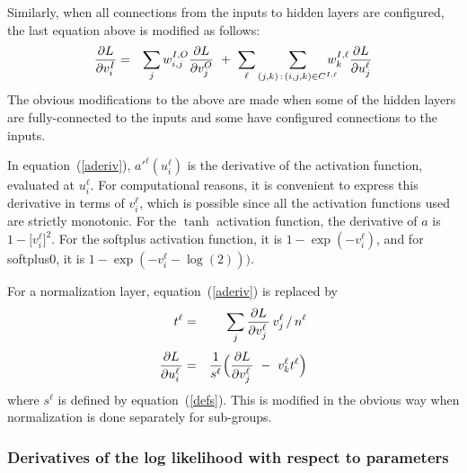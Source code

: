 \documentclass{report}[11pt]
\def\beq{\begin{eqnarray}}
\def\eeq{\end{eqnarray}}
\begin{document}
Similarly, when all connections from the inputs to hidden layers are
configured, the last equation above is modified as follows:\beq
  {\partial L \over \partial v^I_{i\ }\!} & = & 
    \sum_j w^{I,O}_{i,j} {\partial L \over \partial v^O_j}\ +\
    \sum_{\ell} 
         \sum_{(j,k)\,:\, (i,j,k)\in C^{I,\ell}}\!\!\!\!\!\!
             w^{I,\ell}_k {\partial L \over \partial u^{\ell}_j }
\eeq%
The obvious modifications to the above are made when some of the 
hidden layers are fully-connected to the inputs and some have
configured connections to the inputs.

In equation~(\ref{aderiv}), $a'^{\ell}(u^{\ell}_i)$ is the derivative of
the activation function, evaluated at $u^{\ell}_i$.  For computational
reasons, it is convenient to express this derivative in terms of
$v^{\ell}_i$, which is possible since all the activation functions
used are strictly monotonic.  For the $\tanh$ activation function, the
derivative of $a$ is $1 - \big[v^{\ell}_i\big]^2\!$.  For the softplus
activation function, it is $1 - \exp(-v^{\ell}_i)$, and for softplus0,
it is $1 - \exp(-v^{\ell}_i-\log(2)))$.

For a normalization layer, equation~(\ref{aderiv}) is replaced by
\beq
 t^{\ell} & = & 
   \sum_j {\partial L \over \partial v^{\ell}_{j\ }\!}\,v^{\ell}_j\,/\,n^{\ell}
   \\[3pt]
 {\partial L \over \partial u^{\ell}_{i\ }\!} & = & 
   {1 \over s^{\ell}} \Big( {\partial L \over \partial v^{\ell}_{j\ }\!}
     \ -\ v^{\ell}_k t^{\ell} \Big)
\eeq 
where $s^{\ell}$ is defined by equation~(\ref{defs}).  This is modified 
in the obvious way when normalization is done separately for sub-groups.

\subsubsection*{Derivatives of the log likelihood with respect to parameters}
\end{document}
